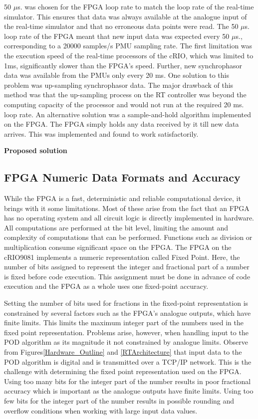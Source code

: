 \documentclass{ieeeaccess}
\begin{document}
50 $\mu$s. was chosen for the FPGA loop rate to match the loop rate of the real-time simulator. This ensures that data was always available at the analogue input of the real-time simulator and that no erroneous data points were read. The 50 $\mu$s. loop rate of the FPGA meant that new input data was expected every 50 $\mu$s., corresponding to a 20000 samples/s PMU sampling rate. The first limitation was the execution speed of the real-time processors of the cRIO, which was limited to 1ms, significantly slower than the FPGA\rq{s} speed. Further, new synchrophasor data was available from the PMUs only every 20 ms. One solution to this problem was up-sampling synchrophasor data. The major drawback of this method was that the up-sampling process on the RT controller was beyond the computing capacity of the processor and would not run at the required 20 ms. loop rate. An alternative solution was a sample-and-hold algorithm implemented on the FPGA. The FPGA simply holds any data received by it till new data arrives. This was implemented and found to work satisfactorily.

\textbf{Proposed solution}

\subsection{FPGA Numeric Data Formats and Accuracy}

While the FPGA is a fast, deterministic and reliable computational device, it brings with it some limitations. Most of these arise from the fact that an FPGA has no operating system and all circuit logic is directly implemented in hardware. All computations are performed at the bit level, limiting the amount and complexity of computations that can be performed. Functions such as division or multiplication consume significant space on the FPGA\cite{LabViewManuals}. The FPGA on the cRIO9081 implements a numeric representation called Fixed Point\cite{LabViewManuals}. Here, the number of bits assigned to represent the integer and fractional part of a number is fixed before code execution\cite{LabViewManuals}. This assignment must be done in advance of code execution and the FPGA as a whole uses one fixed-point accuracy.

Setting the number of bits used for fractions in the fixed-point representation is constrained by several factors such as the FPGA\rq{s} analogue outputs, which have finite limits. This limits the maximum integer part of the numbers used in the fixed point representation. Problems arise, however, when handling input to the POD algorithm as its magnitude it not constrained by analogue limits. Observe from Figures\ref{Hardware_Outline} and \ref{RTArchitecture} that input data to the POD algorithm is digital and is transmitted over a TCP/IP network. This is the challenge with determining the fixed point representation used on the FPGA. Using too many bits for the integer part of the number results in poor fractional accuracy which is important as the analogue outputs have finite limits. Using too few bits for the integer part of the number results in possible rounding and overflow conditions when working with large input data values.
\end{document}
